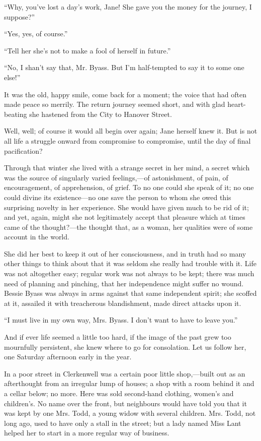 ``Why, you've lost a day's work, Jane! She gave you the money for the
journey, I suppose?''

``Yes, yes, of course.''

``Tell her she's not to make a fool of herself in future.''

``No, I shan't say that, Mr. Byass. But I'm half-tempted to say it to
some one else!''

It was the old, happy smile, come back for a moment; the voice that had
often made peace so merrily. The return journey seemed short, and with
glad heart-beating she hastened from the City to Hanover Street.

Well, well; of course it would all begin over again; Jane herself knew
it. But is not all life a struggle onward from compromise to compromise,
until the day of final pacification?

Through that winter she lived with a strange secret in her mind, a
secret which was the source of singularly varied feelings,---of
astonishment, of pain, of encouragement, of apprehension, of grief. To
no one could she speak of it; no one could divine its existence---no one
save the person to whom she owed this surprising novelty in her
experience. She would have {}given much to be rid of it; and yet, again,
might she not legitimately accept that pleasure which at times came of
the thought?---the thought that, as a woman, her qualities were of some
account in the world.

She did her best to keep it out of her consciousness, and in truth had
so many other things to think about that it was seldom she really had
trouble with it. Life was not altogether easy; regular work was not
always to be kept; there was much need of planning and pinching, that
her independence might suffer no wound. Bessie Byass was always in arms
against that same independent spirit; she scoffed at it, assailed it
with treacherous blandishment, made direct attacks upon it.

``I must live in my own way, Mrs. Byass. I don't want to have to leave
you.''

And if ever life seemed a little too hard, if the image of the past grew
too mournfully persistent, she knew where to go for consolation. Let us
follow her, one Saturday afternoon early in the year.

In a poor street in Clerkenwell was a certain poor little shop,---built
out as an afterthought from an irregular lump of houses; a shop with {}a
room behind it and a cellar below; no more. Here was sold second-hand
clothing, women's and children's. No name over the front, but neighbours
would have told you that it was kept by one Mrs. Todd, a young widow
with several children. Mrs. Todd, not long ago, used to have only a
stall in the street; but a lady named Miss Lant helped her to start in a
more regular way of business.

